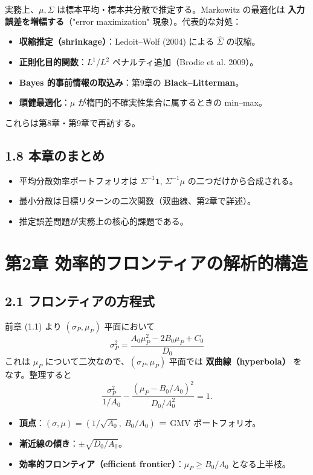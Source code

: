 \documentclass[11pt,a4paper]{report}
\begin{document}
実務上、$\mu, \Sigma$ は標本平均・標本共分散で推定する。Markowitz の最適化は \textbf{入力誤差を増幅する}（"error maximization" 現象）。代表的な対処：

\begin{itemize}
\item \textbf{収縮推定（shrinkage）}：Ledoit–Wolf (2004) による $\hat\Sigma$ の収縮。
\item \textbf{正則化目的関数}：$L^1$/$L^2$ ペナルティ追加（Brodie et al. 2009）。
\item \textbf{Bayes 的事前情報の取込み}：第9章の \textbf{Black–Litterman}。
\item \textbf{頑健最適化}：$\mu$ が楕円的不確実性集合に属するときの min–max。
\end{itemize}

これらは第8章・第9章で再訪する。

\section{1.8 本章のまとめ}

\begin{itemize}
\item 平均分散効率ポートフォリオは $\Sigma^{-1}\mathbf{1}$, $\Sigma^{-1}\mu$ の二つだけから合成される。
\item 最小分散は目標リターンの二次関数（双曲線、第2章で詳述）。
\item 推定誤差問題が実務上の核心的課題である。
\end{itemize}

\noindent\hrulefill

\chapter{第2章 効率的フロンティアの解析的構造}

\section{2.1 フロンティアの方程式}

前章 (1.1) より $(\sigma_P, \mu_P)$ 平面において \[ \sigma_P^2 = \frac{A_0 \mu_P^2 - 2 B_0 \mu_P + C_0}{D_0} \] これは $\mu_P$ について二次なので、$(\sigma_P, \mu_P)$ 平面では \textbf{双曲線（hyperbola）} をなす。整理すると \[ \frac{\sigma_P^2}{1/A_0} - \frac{(\mu_P - B_0/A_0)^2}{D_0/A_0^2} = 1. \tag{2.1} \]

\begin{itemize}
\item \textbf{頂点}：$(\sigma, \mu) = (1/\sqrt{A_0},\ B_0/A_0)$ ＝ GMV ポートフォリオ。
\item \textbf{漸近線の傾き}：$\pm \sqrt{D_0/A_0}$。
\item \textbf{効率的フロンティア（efficient frontier）}：$\mu_P \ge B_0/A_0$ となる上半枝。
\end{itemize}
\end{document}
